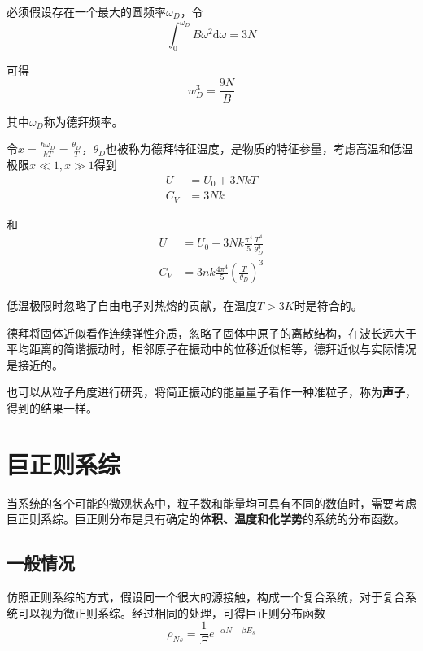 \documentclass[UTF8]{ctexart}
\newcommand{\dif}{\mathrm{d}}
\begin{document}
\noindent 必须假设存在一个最大的圆频率$ \omega_{D} $，令
\begin{equation}
	\int_{0}^{\omega_{D}} B \omega^{2} \dif \omega = 3 N
\end{equation}

\noindent 可得
\begin{equation}
w_{D}^{3}=\frac{9 N}{B}
\end{equation}

\noindent 其中$ \omega_{D} $称为德拜频率。

	令$ x=\frac{\hbar \omega_{D}}{k T}=\frac{\theta_{D}}{T} $，$ \theta_{D} $也被称为德拜特征温度，是物质的特征参量，考虑高温和低温极限$ x \ll 1, x \gg 1 $得到
	\begin{equation}
	\begin{aligned}
	U&=U_{0}+3NkT\\
	C_{V}&=3Nk
	\end{aligned}
	\end{equation}
	
\noindent 和
\begin{equation}
	\begin{aligned}
	U&=U_{0}+3Nk \frac{\pi^{4}}{5} \frac{T^{4}}{\theta_{D}^{3}}\\
	C_{V}&=3nk \frac{4 \pi^{4}}{5} \left(\frac{T}{\theta_{D}}\right)^{3}
	\end{aligned}
\end{equation}

\noindent 低温极限时忽略了自由电子对热熔的贡献，在温度$ T>3K $时是符合的。

	德拜将固体近似看作连续弹性介质，忽略了固体中原子的离散结构，在波长远大于平均距离的简谐振动时，相邻原子在振动中的位移近似相等，德拜近似与实际情况是接近的。
	
	也可以从粒子角度进行研究，将简正振动的能量量子看作一种准粒子，称为\textbf{声子}，得到的结果一样。
	
	\section{巨正则系综}
	当系统的各个可能的微观状态中，粒子数和能量均可具有不同的数值时，需要考虑巨正则系综。巨正则分布是具有确定的\textbf{体积、温度和化学势}的系统的分布函数。
	
	\subsection{一般情况}
	仿照正则系综的方式，假设同一个很大的源接触，构成一个复合系统，对于复合系统可以视为微正则系综。经过相同的处理，可得巨正则分布函数
	\begin{equation}
	\rho_{Ns}=\frac{1}{\Xi} e^{-\alpha N-\beta E_s}
	\end{equation}
	
\end{document}
